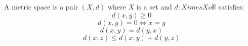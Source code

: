 A metric space is a pair $(X, d)$ where $X$ is a set and $d: X 	imes X 	o \mathbb{R}$ satisfies:
$$d(x, y) \geq 0$$
$$d(x, y) = 0 \iff x = y$$
$$d(x, y) = d(y, x)$$
$$d(x, z) \leq d(x, y) + d(y, z)$$
